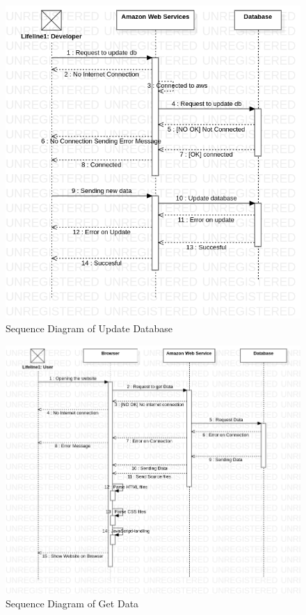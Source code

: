 \begin{figure}[H]
    \includegraphics[scale = 0.7]{assets/SequenceDiagramUpdateDB.png}
    \caption[Sequence Diagram of Update Database]{Sequence Diagram of Update Database}
\end{figure}

\begin{figure}[H]
    \includegraphics[scale = 0.6]{assets/SequenceDiagramOpenBrowser.png}
    \caption[Sequence Diagram of Get Data]{Sequence Diagram of Get Data}
\end{figure}

